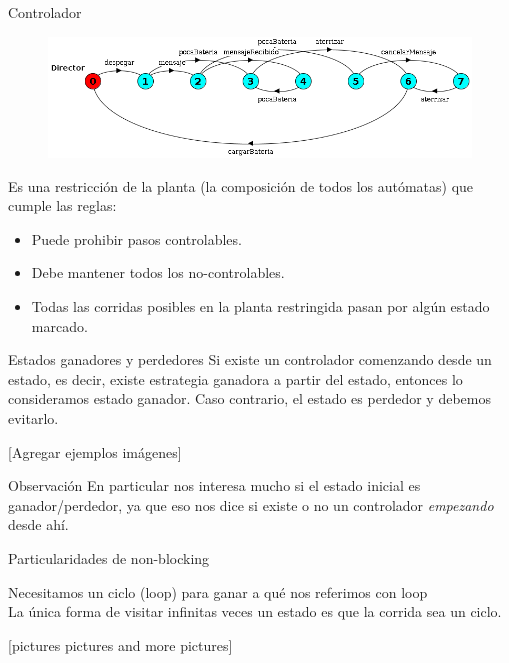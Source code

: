 \begin{frame}{Controlador}
    \begin{figure}
     \includegraphics[width=\textwidth]{figures/director.png}
    \end{figure}

    Es una restricción de la planta (la composición de todos los autómatas) que cumple las reglas:

    \begin{itemize}
     \item Puede prohibir pasos controlables.
     \item Debe mantener todos los no-controlables.
     \item Todas las corridas posibles en la planta restringida pasan por algún estado marcado.
    \end{itemize}
\end{frame}
\begin{frame}{Estados ganadores y perdedores}
    Si existe un controlador comenzando desde un estado, es decir, existe estrategia ganadora a partir del estado, entonces lo consideramos estado ganador. 
    Caso contrario, el estado es perdedor y debemos evitarlo.
    
    [Agregar ejemplos imágenes]
    
    \begin{block}{Observación}
        En particular nos interesa mucho si el estado inicial es ganador/perdedor, ya que eso nos dice si existe o no un controlador \textit{empezando} desde ahí.
    \end{block}

\end{frame}
\begin{frame}{Particularidades de non-blocking}
    \begin{block}{Necesitamos un ciclo (loop) para ganar}
        a qué nos referimos con loop\\
        La única forma de visitar infinitas veces un estado es que la corrida sea un ciclo.
    \end{block}
    
    [pictures pictures and more pictures]
\end{frame}
